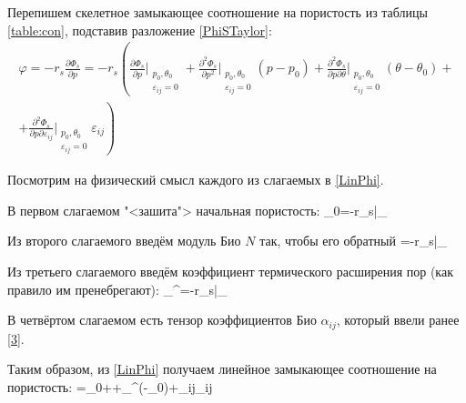 \documentclass[main.tex]{subfiles}
\begin{document}
\begin{comment}
\begin{center}
	Ход чёрных
	\medskip
	
	\newgame
	\fenboard{r2qnrk1/p3p3/2p3p1/3pb2P/6p1/2N1B3/PPPQ4/2KR3R w - - 0 20}
	\showboard
\end{center}
\end{comment}

Перепишем скелетное замыкающее соотношение на пористость из таблицы \ref{table:con}, подставив разложение \ref{PhiSTaylor}:
\begin{multline}\label{LinPhi}
\varphi=-r_s\frac{\partial\Phi_s}{\partial p}=-r_s\left(\frac{\partial\Phi_s}{\partial p}\bigg|_{\substack{p_0,\theta_0\\\varepsilon_{ij}=0}}+\frac{\partial^2\Phi_s}{\partial p^2}\bigg|_{\substack{p_0,\theta_0\\\varepsilon_{ij}=0}}\left(p-p_0\right)+\frac{\partial^2\Phi_s}{\partial p\partial\theta}\bigg|_{\substack{p_0,\theta_0\\\varepsilon_{ij}=0}}\left(\theta-\theta_0\right)+\right.\\+\left.\frac{\partial^2\Phi_s}{\partial p\partial\varepsilon_{ij}}\bigg|_{\substack{p_0,\theta_0\\\varepsilon_{ij}=0}}\varepsilon_{ij}\right)
\end{multline}

Посмотрим на физический смысл каждого из слагаемых в \eqref{LinPhi}.

В первом слагаемом "<зашита"> начальная пористость:
\beq
\varphi_0=-r_s\bigg|_{}
\eeq

Из второго слагаемого введём модуль Био $N$ так, чтобы его обратный
\beq
{}=-r_s\bigg|_{}
\eeq

Из третьего слагаемого введём коэффициент термического расширения пор (как правило им пренебрегают):
\beq
\alpha_\theta^\varphi=-r_s\bigg|_{}
\eeq

В четвёртом слагаемом есть тензор коэффициентов Био $\alpha_{ij}$, который ввели ранее \eqref{3}.

Таким образом, из \eqref{LinPhi} получаем линейное замыкающее соотношение на пористость:
\beq
\varphi=\varphi_0++\alpha_\theta^\varphi\left(\theta-\theta_0\right)+\alpha_{ij}\varepsilon_{ij}
\eeq
\end{document}
